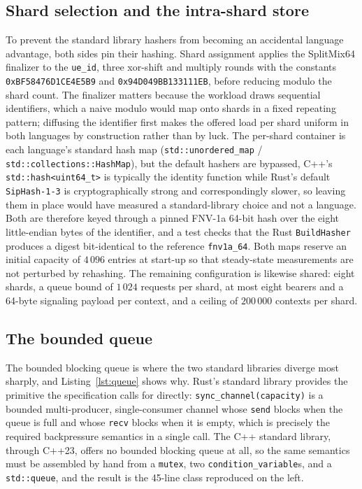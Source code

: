 \documentclass[english,twoside,openright,a4paper,censored,csm,software-track-2020]{HYthesisML}
\begin{document}
\subsection{Shard selection and the intra-shard store}
To prevent the standard library hashers from becoming an accidental language advantage, both
sides pin their hashing. Shard assignment applies the SplitMix64 finalizer to the
\texttt{ue\_id}, three xor-shift and multiply rounds with the constants
\texttt{0xBF58476D1CE4E5B9} and \texttt{0x94D049BB133111EB}, before reducing modulo the shard
count. The finalizer matters because the workload draws sequential identifiers, which a naive
modulo would map onto shards in a fixed repeating pattern; diffusing the identifier first
makes the offered load per shard uniform in both languages by construction rather than by
luck. The per-shard container is each language's standard hash map
(\texttt{std::unordered\_map} / \texttt{std::collections::HashMap}), but the default hashers
are bypassed, C++'s \texttt{std::hash<uint64\_t>} is typically the identity function while
Rust's default \texttt{SipHash-1-3} is cryptographically strong and correspondingly slower,
so leaving them in place would have measured a standard-library choice and not a language.
Both are therefore keyed through a pinned FNV-1a 64-bit hash over the eight little-endian
bytes of the identifier, and a test checks that the Rust \texttt{BuildHasher} produces a
digest bit-identical to the reference \texttt{fnv1a\_64}. Both maps reserve an initial
capacity of $4\,096$ entries at start-up so that steady-state measurements are not perturbed
by rehashing. The remaining configuration is likewise shared: eight shards, a queue bound of
$1\,024$ requests per shard, at most eight bearers and a 64-byte signaling payload per
context, and a ceiling of $200\,000$ contexts per shard.

\subsection{The bounded queue}
The bounded blocking queue is where the two standard libraries diverge most sharply, and
Listing~\ref{lst:queue} shows why. Rust's standard library provides the primitive the
specification calls for directly: \texttt{sync\_channel(capacity)} is a bounded multi-producer,
single-consumer channel whose \texttt{send} blocks when the queue is full and whose
\texttt{recv} blocks when it is empty, which is precisely the required backpressure semantics
in a single call. The C++ standard library, through C++23, offers no bounded blocking queue at
all, so the same semantics must be assembled by hand from a \texttt{mutex}, two
\texttt{condition\_variable}s, and a \texttt{std::queue}, and the result is the 45-line class
reproduced on the left.
\end{document}

